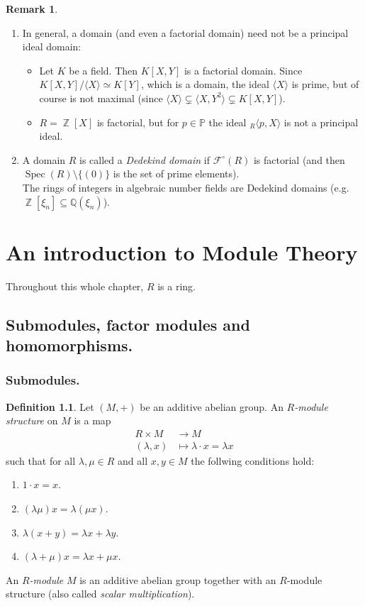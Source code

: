 \documentclass[12pt,a4paper]{report}
\theoremstyle{definition}
\newtheorem{defn}[theorem]{Definition}
\newtheorem*{remark}{Remark}
\theoremstyle{num.custom-title}
\DeclareMathOperator{\Z}{\mathbb{Z}}
\DeclareMathOperator{\sm}{\setminus}
\DeclareMathOperator{\sse}{\subseteq}
\DeclareMathOperator{\Spec}{Spec}
\newcommand{\F}{\mathcal{F}}
\newcommand{\Q}{\mathbb{Q}}
\renewcommand{\P}{\mathbb{P}}
\begin{document}
\begin{remark}\ 
\begin{enumerate}
\item In general, a domain (and even a factorial domain) need not be a principal ideal domain:
\begin{itemize}
\item Let $K$ be a field. Then $K[X,Y]$ is a factorial domain. Since $K[X,Y]/\langle X \rangle \simeq K[Y]$, which is a domain, the ideal $\langle X \rangle$ is prime, but of course is not maximal (since $\langle X \rangle \subsetneq \langle X, Y^2 \rangle \subsetneq K[X,Y]$).
\item $R=\Z[X]$ is factorial, but for $p \in \P$ the ideal ${}_R\langle p,X \rangle$ is not a principal ideal.
\end{itemize}
\item A domain $R$ is called a \emph{Dedekind domain} if $\F^\circ(R)$ is factorial (and then $\Spec(R) \sm \{(0)\}$ is the set of prime elements).\\
The rings of integers in algebraic number fields are Dedekind domains (e.g. $\Z[\xi_n] \sse \Q(\xi_n)$).
\end{enumerate}
\end{remark}


\chapter{An introduction to Module Theory}

Throughout this whole chapter, $R$ is a ring.

\section{Submodules, factor modules and homomorphisms.}

\subsection{Submodules.}

\begin{defn}
Let $(M,+)$ be an additive abelian group. An \emph{$R$-module structure} on $M$ is a map
\begin{align*}
R \times M &\to M \\
(\lambda,x) &\mapsto \lambda \cdot x = \lambda x
\end{align*}
such that for all $\lambda,\mu \in R$ and all $x,y \in M$ the follwing conditions hold:
\begin{enumerate}
\item $1 \cdot x = x$.
\item $(\lambda \mu) x = \lambda (\mu x)$.
\item $\lambda (x+y) = \lambda x + \lambda y$.
\item $(\lambda + \mu) x = \lambda x + \mu x$.
\end{enumerate}
An \emph{$R$-module} $M$ is an additive abelian group together with an $R$-module structure (also called \emph{scalar multiplication}).
\end{defn}
\end{document}
